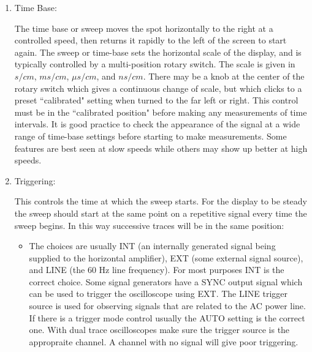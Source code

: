 \documentclass[12pt, a4paper, oneside, openright, titlepage]{book}
\begin{document}
\begin{enumerate}
    \item Time Base:

        The time base or sweep moves the spot horizontally to the right at a controlled speed, then returns it rapidly to the left of the screen to start again. The sweep or time-base sets the horizontal scale of the display, and is typically controlled by a multi-position rotary switch. The scale is given in $s/cm$, $ms/cm$, $\mu s/cm$, and $ns/cm$. There may be a knob at the center of the rotary switch which gives a continuous change of scale, but which clicks to a preset ``calibrated" setting when turned to the far left or right. This control must be in the ``calibrated position" before making any measurements of time intervals. It is good practice to check the appearance of the signal at a wide range of time-base settings before starting to make measurements. Some features are best seen at slow speeds while others may show up better at high speeds.

    \item Triggering:

        This controls the time at which the sweep starts. For the display to be steady the sweep should start at the same point on a repetitive signal every time the sweep begins. In this way successive traces will be in the same position:
        \begin{itemize}
            \item {} The choices are usually INT (an internally generated signal being supplied to the horizontal amplifier), EXT (some external signal source), and LINE (the $60$ Hz line frequency). For most purposes INT is the correct choice. Some signal generators have a SYNC output signal which can be used to trigger the oscilloscope using EXT. The LINE trigger source is used for observing signals that are related to the AC power line. If there is a trigger mode control usually the AUTO setting is the correct one. With dual trace oscilloscopes make sure the trigger source is the appropraite channel. A channel with no signal will give poor triggering.


\end{itemize}
\end{enumerate}
\end{document}
